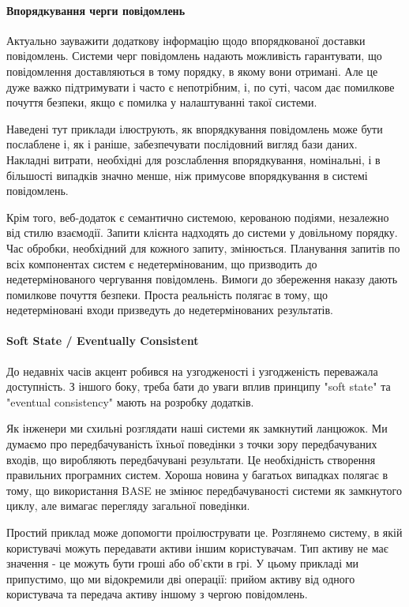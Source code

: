\documentclass[14pt]{vakthesis}
\begin{document}
\paragraph{Впорядкування черги повідомлень}

Актуально зауважити додаткову інформацію щодо впорядкованої доставки повідомлень. 
Системи черг повідомлень надають можливість гарантувати, що повідомлення доставляються в тому порядку, в якому вони отримані. 
Але це дуже важко підтримувати і часто є непотрібним, і, по суті, часом дає помилкове почуття безпеки, якщо є помилка у налаштуванні такої системи.

Наведені тут приклади ілюструють, як впорядкування повідомлень може бути послаблене і, як і раніше, забезпечувати послідовний вигляд бази даних. 
Накладні витрати, необхідні для розслаблення впорядкування, номінальні, і в більшості випадків значно менше, ніж примусове впорядкування в системі повідомлень.

Крім того, веб-додаток є семантично системою, керованою подіями, незалежно від стилю взаємодії. Запити клієнта надходять до системи у довільному порядку. 
Час обробки, необхідний для кожного запиту, змінюється. Планування запитів по всіх компонентах систем є недетермінованим, 
що призводить до недетермінованого чергування повідомлень. Вимоги до збереження наказу дають помилкове почуття безпеки. Проста реальність полягає в тому, що недетерміновані входи призведуть до недетермінованих результатів.

\paragraph{Soft State / Eventually Consistent}

До недавніх часів акцент робився на узгодженості і узгодженість переважала доступність. З іншого боку, треба бати до уваги вплив принципу "soft state"
та "eventual consistency" мають на розробку додатків.

Як інженери ми схильні розглядати наші системи як замкнутий ланцюжок. 
Ми думаємо про передбачуваність їхньої поведінки з точки зору передбачуваних входів, що виробляють передбачувані результати. Це необхідність створення правильних програмних систем. Хороша новина у багатьох випадках полягає в тому, що використання BASE не змінює передбачуваності системи як замкнутого циклу, але вимагає перегляду загальної поведінки.

Простий приклад може допомогти проілюструвати це. Розглянемо систему, в якій користувачі можуть передавати активи іншим користувачам. Тип активу не має значення - це можуть бути гроші або об'єкти в грі. 
У цьому прикладі ми припустимо, що ми відокремили дві операції: прийом активу від одного користувача та передача активу іншому з чергою повідомлень.
\end{document}
